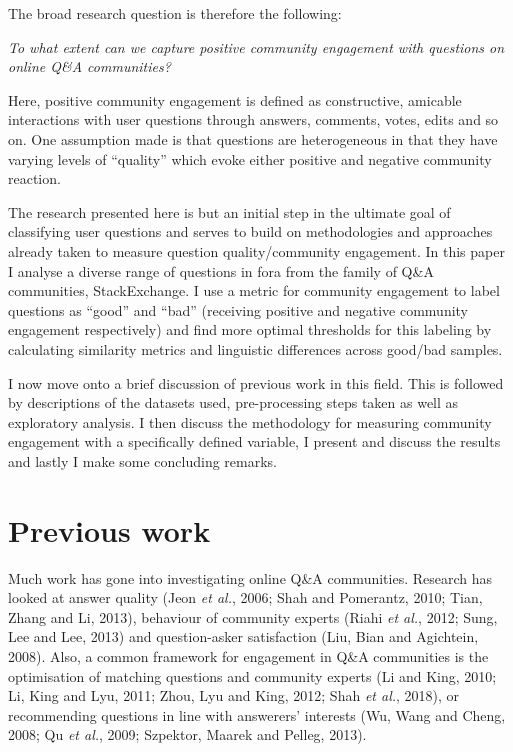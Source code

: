 \documentclass[12pt,preprint, authoryear]{article}
\numberwithin{equation}{section}
\numberwithin{figure}{section}
\numberwithin{table}{section}
\begin{document}
The broad research question is therefore the following:

\begin{center}
\emph{To what extent can we capture positive community engagement with questions on online Q\&A communities?}
\end{center}

Here, positive community engagement is defined as constructive, amicable
interactions with user questions through answers, comments, votes, edits
and so on. One assumption made is that questions are heterogeneous in
that they have varying levels of ``quality'' which evoke either positive
and negative community reaction.

The research presented here is but an initial step in the ultimate goal
of classifying user questions and serves to build on methodologies and
approaches already taken to measure question quality/community
engagement. In this paper I analyse a diverse range of questions in fora
from the family of Q\&A communities, StackExchange. I use a metric for
community engagement to label questions as ``good'' and ``bad''
(receiving positive and negative community engagement respectively) and
find more optimal thresholds for this labeling by calculating similarity
metrics and linguistic differences across good/bad samples.

I now move onto a brief discussion of previous work in this field. This
is followed by descriptions of the datasets used, pre-processing steps
taken as well as exploratory analysis. I then discuss the methodology
for measuring community engagement with a specifically defined variable,
I present and discuss the results and lastly I make some concluding
remarks.

\section{Previous work}\label{previous-work}

Much work has gone into investigating online Q\&A communities. Research
has looked at answer quality (Jeon \emph{et al.}, 2006; Shah and
Pomerantz, 2010; Tian, Zhang and Li, 2013), behaviour of community
experts (Riahi \emph{et al.}, 2012; Sung, Lee and Lee, 2013) and
question-asker satisfaction (Liu, Bian and Agichtein, 2008). Also, a
common framework for engagement in Q\&A communities is the optimisation
of matching questions and community experts (Li and King, 2010; Li, King
and Lyu, 2011; Zhou, Lyu and King, 2012; Shah \emph{et al.}, 2018), or
recommending questions in line with answerers' interests (Wu, Wang and
Cheng, 2008; Qu \emph{et al.}, 2009; Szpektor, Maarek and Pelleg, 2013).
\end{document}
